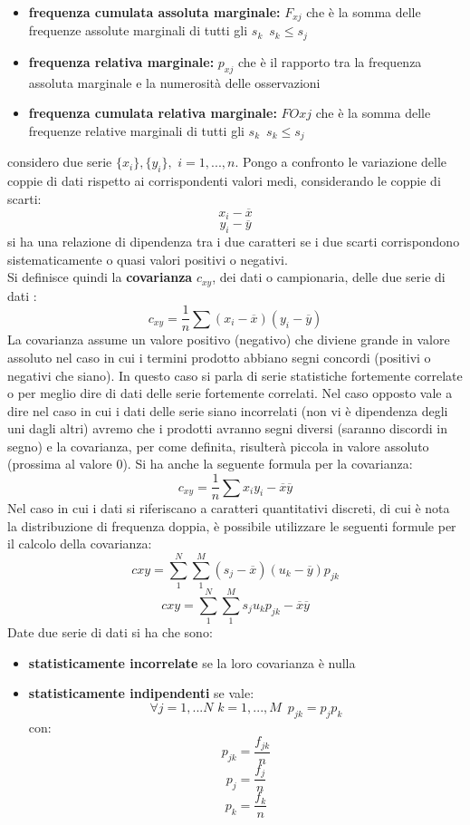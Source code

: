 \documentclass[a4paper,12pt, oneside]{book}
\begin{document}
\begin{itemize}
\item \textbf{frequenza cumulata assoluta marginale:} $F_{xj}$ che è la somma delle frequenze assolute marginali di tutti gli $s_k\,\,\,s_k\leq s_j$ 
\item \textbf{frequenza relativa marginale:} $p_{xj}$ che è il rapporto tra la frequenza assoluta marginale e la numerosità delle osservazioni
\item \textbf{frequenza cumulata relativa marginale:} $FO{xj}$ che è la somma delle frequenze relative marginali di tutti gli $s_k\,\,\,s_k\leq s_j$  
\end{itemize}
considero due serie $\{x_i\},\{y_i\},\,\,i=1,...,n$. Pongo a confronto le variazione delle coppie di dati rispetto ai corrispondenti valori medi, considerando le coppie di scarti:
$$x_i-\overline{x}$$
$$y_i-\overline{y}$$
si ha una relazione di dipendenza tra i due caratteri se i due scarti corrispondono sistematicamente o quasi valori positivi o negativi.\\
Si definisce quindi la \textbf{covarianza} $c_{xy}$, dei dati o campionaria, delle due serie di dati :
$$c_{xy}=\frac{1}{n}\sum (x_i-\overline{x})(y_i-\overline{y})$$
La covarianza assume un valore positivo (negativo) che diviene grande in valore assoluto nel caso in cui i termini prodotto abbiano segni concordi (positivi o negativi che siano). In questo caso si parla di serie statistiche fortemente correlate o per meglio dire di
dati delle serie fortemente correlati. Nel caso opposto vale a dire nel caso in cui i dati delle serie siano incorrelati (non vi è dipendenza degli uni dagli altri) avremo che i prodotti avranno segni diversi (saranno discordi in segno) e la covarianza, per come definita,
risulterà piccola in valore assoluto (prossima al valore 0).
Si ha anche la seguente formula per la covarianza:
$$c_{xy}=\frac{1}{n}\sum x_iy_i-\overline{x}\overline{y}$$
Nel caso in cui i dati si riferiscano a caratteri quantitativi discreti, di cui è nota la
distribuzione di frequenza doppia, è possibile utilizzare le seguenti formule per il calcolo della covarianza:
$$c{xy}=\sum_1^N\sum_1^M(s_j-\overline{x})(u_k-\overline{y})p_{jk}$$
$$c{xy}=\sum_1^N\sum_1^Ms_ju_kp_{jk}-\overline{x}\overline{y}$$
Date due serie di dati si ha che sono:
\begin{itemize}
\item \textbf{statisticamente incorrelate} se la loro covarianza è nulla
\item \textbf{statisticamente indipendenti} se vale:
$$\forall j=1,...N\,\,k=1,...,M\,\,\, p_{jk}=p_jp_k$$
con:
$$p_{jk}=\frac{f_{jk}}{n}$$
$$p_{j}=\frac{f_{j}}{n}$$
$$p_{k}=\frac{f_{k}}{n}$$
\end{itemize}
\end{document}
